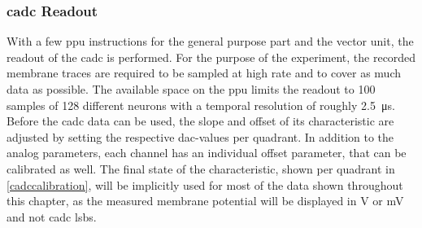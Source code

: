 \subsubsection*{\gls{cadc} Readout}
With a few \gls{ppu} instructions for the general purpose part and the vector unit, the readout of the \gls{cadc} is performed. For the purpose of the experiment, the recorded membrane traces are required to be sampled at high rate and to cover as much data as possible. The available space on the \gls{ppu} limits the readout to 100 samples of 128 different neurons with a temporal resolution of roughly \SI{2.5}{\micro \s}. Before the \gls{cadc} data can be used, the slope and offset of its characteristic are adjusted by setting the respective \gls{dac}-values per quadrant. In addition to the analog parameters, each channel has an individual offset parameter, that can be calibrated as well. The final state of the characteristic, shown per quadrant in \cref{cadccalibration}, will be implicitly used for most of the data shown throughout this chapter, as the measured membrane potential will be displayed in \si{\V} or \si{\milli \V} and not \gls{cadc} lsbs.
